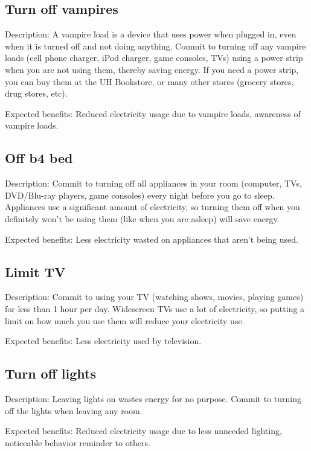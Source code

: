 \subsection{Turn off vampires}

Description: A vampire load is a device that uses power when plugged in, even when it is turned off and not doing anything. Commit to turning off any vampire loads (cell phone charger, iPod charger, game consoles, TVs) using a power strip when you are not using them, thereby saving energy. If you need a power strip, you can buy them at the UH Bookstore, or many other stores (grocery stores, drug stores, etc).

Expected benefits: Reduced electricity usage due to vampire loads, awareness of vampire loads.


\subsection{Off b4 bed}

Description: Commit to turning off all appliances in your room (computer, TVs, DVD/Blu-ray players, game consoles) every night before you go to sleep. Appliances use a significant amount of electricity, so turning them off when you definitely won't be using them (like when you are asleep) will save energy.

Expected benefits: Less electricity wasted on appliances that aren't being used.


\subsection{Limit TV}

Description: Commit to using your TV (watching shows, movies, playing games) for less than 1 hour per day. Widescreen TVs use a lot of electricity, so putting a limit on how much you use them will reduce your electricity use.

Expected benefits: Less electricity used by television.


\subsection{Turn off lights}

Description: Leaving lights on wastes energy for no purpose. Commit to turning off the lights when leaving any room.

Expected benefits: Reduced electricity usage due to less unneeded lighting, noticeable behavior reminder to others.


